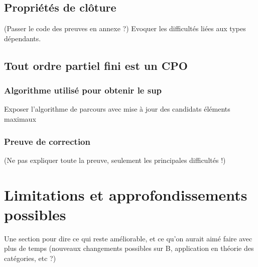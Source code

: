 \documentclass{article}
\theoremstyle{definition}
\begin{document}





\subsection{Propriétés de clôture}
\label{cloture}

(Passer le code des preuves en annexe ?)
Evoquer les difficultés liées aux types dépendants.


\subsection{Tout ordre partiel fini est un CPO}
\label{ordrepartiel}

\subsubsection{Algorithme utilisé pour obtenir le sup}

Exposer l'algorithme de parcours avec mise à jour des candidats éléments maximaux

\subsubsection{Preuve de correction}

(Ne pas expliquer toute la preuve, seulement les principales difficultés !)



\section{Limitations et approfondissements possibles}

Une section pour dire ce qui reste améliorable, et ce qu'on aurait aimé faire avec plus de temps (nouveaux changements possibles sur B, application en théorie des catégories, etc ?)
\end{document}
